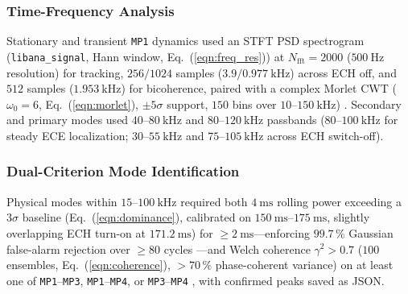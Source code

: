 \subsubsection{Time-Frequency Analysis}
Stationary and transient \texttt{MP1} dynamics used an STFT PSD spectrogram (\texttt{libana\_signal}, Hann window, Eq.~(\ref{eqn:freq_res})) \cite{proakis2021digital} at $N_{\mathrm{fft}} = 2000$ ($500~\mathrm{Hz}$ resolution) for tracking, $256/1024$ samples ($3.9/0.977~\mathrm{kHz}$) across ECH off, and $512$ samples ($1.953~\mathrm{kHz}$) for bicoherence, paired with a complex Morlet CWT ($\omega_0 = 6$, Eq.~(\ref{eqn:morlet}), $\pm 5\sigma$ support, $150$ bins over $10\text{--}150~\mathrm{kHz}$) \cite{boashash2015time, addison2016illustrated}. Secondary and primary modes used $40\text{--}80~\mathrm{kHz}$ and $80\text{--}120~\mathrm{kHz}$ passbands ($80\text{--}100~\mathrm{kHz}$ for steady ECE localization; $30\text{--}55~\mathrm{kHz}$ and $75\text{--}105~\mathrm{kHz}$ across ECH switch-off).

\subsubsection{Dual-Criterion Mode Identification}
Physical modes within $15\text{--}100~\mathrm{kHz}$ required both $4~\mathrm{ms}$ rolling power exceeding a $3\sigma$ baseline (Eq.~(\ref{eqn:dominance}), calibrated on $150~\mathrm{ms} \text{--}175~\mathrm{ms}$, slightly overlapping ECH turn-on at $171.2~\mathrm{ms}$) for $\ge 2~\mathrm{ms}$---enforcing $99.7\,\%$ Gaussian false-alarm rejection over $\ge 80$ cycles \cite{bendat2010random}---and Welch coherence $\gamma^2 > 0.7$ ($100$ ensembles, Eq.~(\ref{eqn:coherence}), $>70\,\%$ phase-coherent variance) on at least one of \texttt{MP1}--\texttt{MP3}, \texttt{MP1}--\texttt{MP4}, or \texttt{MP3}--\texttt{MP4} \cite{KraemerFlecken2024, Singh2024}, with confirmed peaks saved as JSON.

